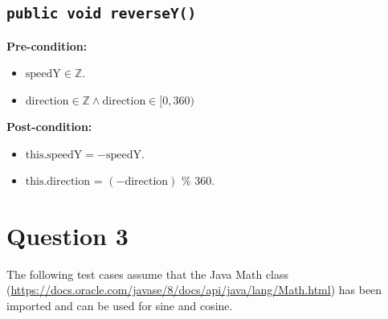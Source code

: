 \documentclass{article}
\begin{document}
\subsection*{\texttt{public void reverseY()}}
\textbf{Pre-condition:}
\begin{itemize}
    \item \( \text{speedY} \in \mathbb{Z} \).
    \item \( \text{direction} \in \mathbb{Z} \wedge \text{direction} \in [0,360) \)
\end{itemize}

\textbf{Post-condition:}
\begin{itemize}
    \item \( \text{this.speedY} = -\text{speedY} \).
    \item \( \text{this.direction} \) = \( (-\text{direction}) \) \% 360.
\end{itemize}

\section*{Question 3}

The following test cases assume that the Java Math class (\url{https://docs.oracle.com/javase/8/docs/api/java/lang/Math.html}) has been imported and can be used for sine and cosine.
\end{document}
